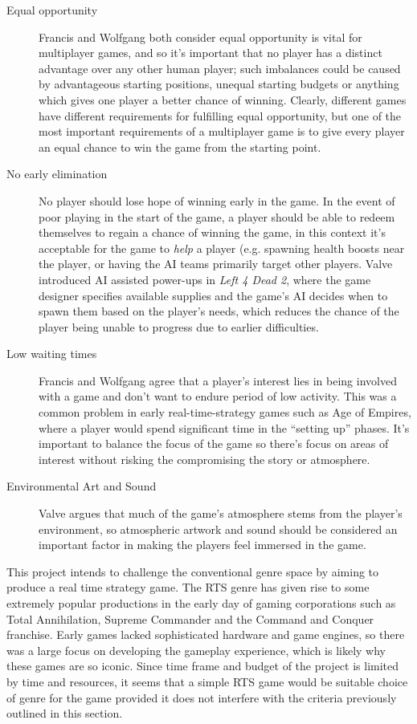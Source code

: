 \begin{description}
\item[Equal opportunity]
Francis and Wolfgang both consider equal opportunity is vital for multiplayer games, and so it's important that no player has a distinct advantage over any other human player; such imbalances could be caused by advantageous starting positions, unequal starting budgets or  anything which gives one player a better chance of winning. Clearly, different games have different requirements for fulfilling equal opportunity, but one of the most important requirements of a multiplayer game is to give every player an equal chance to win the game from the starting point. \cite{tomfrancis} \cite{wolfgangkramer}

\item[No early elimination]
No player should lose hope of winning early in the game. In the event of poor playing in the start of the game, a player should be able to redeem themselves to regain a chance of winning the game, in this context it's acceptable for the game to \emph{help} a player (e.g. spawning health boosts near the player, or having the AI teams primarily target other players. Valve introduced AI assisted power-ups in \emph{Left 4 Dead 2}, where the game designer specifies available supplies and the game's AI decides when to spawn them based on the player's needs, which reduces the chance of the player being unable to progress due to earlier difficulties. 

\item[Low waiting times]
Francis and Wolfgang agree that a player's interest lies in being involved with a game and don't want to endure period of low activity. This was a common problem in early real-time-strategy games such as Age of Empires, where a player would spend significant time in the ``setting up'' phases. It's important to balance the focus of the game so there's focus on areas of interest without risking the compromising the story or atmosphere. \cite{tomfrancis} \cite{wolfgangkramer}

\item[Environmental Art and Sound]
Valve argues that much of the game's atmosphere stems from the player's environment, so atmospheric artwork and sound should be considered an important factor in making the players feel immersed in the game.


\end{description}


This project intends to challenge the conventional genre space by aiming to produce a real time strategy game. The RTS genre has given rise to some extremely popular productions in the early day of gaming corporations such as Total Annihilation, Supreme Commander and the Command and Conquer franchise. Early games lacked sophisticated hardware and game engines, so there was a large focus on developing the gameplay experience, which is likely why these games are so iconic. Since time frame and budget of the project is limited by time and resources, it seems that a simple RTS game would be suitable choice of genre for the game provided it does not interfere with the criteria previously outlined in this section.
